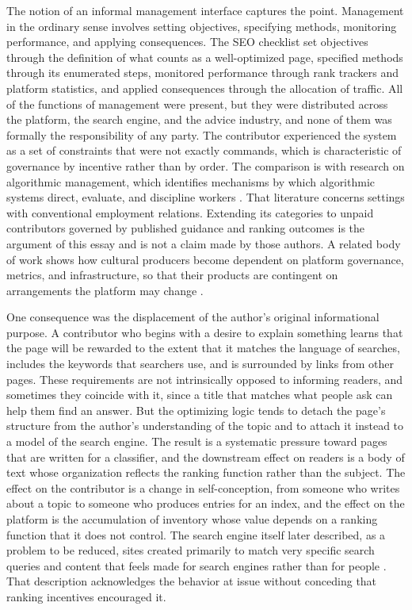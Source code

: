 \documentclass[11pt]{article}
\theoremstyle{remark}
\begin{document}
The notion of an informal management interface captures the point. Management in the ordinary sense involves setting objectives, specifying methods, monitoring performance, and applying consequences. The SEO checklist set objectives through the definition of what counts as a well-optimized page, specified methods through its enumerated steps, monitored performance through rank trackers and platform statistics, and applied consequences through the allocation of traffic. All of the functions of management were present, but they were distributed across the platform, the search engine, and the advice industry, and none of them was formally the responsibility of any party. The contributor experienced the system as a set of constraints that were not exactly commands, which is characteristic of governance by incentive rather than by order. The comparison is with research on algorithmic management, which identifies mechanisms by which algorithmic systems direct, evaluate, and discipline workers \cite{kellogg2020}. That literature concerns settings with conventional employment relations. Extending its categories to unpaid contributors governed by published guidance and ranking outcomes is the argument of this essay and is not a claim made by those authors. A related body of work shows how cultural producers become dependent on platform governance, metrics, and infrastructure, so that their products are contingent on arrangements the platform may change \cite{nieborg2018}.

One consequence was the displacement of the author's original informational purpose. A contributor who begins with a desire to explain something learns that the page will be rewarded to the extent that it matches the language of searches, includes the keywords that searchers use, and is surrounded by links from other pages. These requirements are not intrinsically opposed to informing readers, and sometimes they coincide with it, since a title that matches what people ask can help them find an answer. But the optimizing logic tends to detach the page's structure from the author's understanding of the topic and to attach it instead to a model of the search engine. The result is a systematic pressure toward pages that are written for a classifier, and the downstream effect on readers is a body of text whose organization reflects the ranking function rather than the subject. The effect on the contributor is a change in self-conception, from someone who writes about a topic to someone who produces entries for an index, and the effect on the platform is the accumulation of inventory whose value depends on a ranking function that it does not control. The search engine itself later described, as a problem to be reduced, sites created primarily to match very specific search queries and content that feels made for search engines rather than for people \cite{tucker2024}. That description acknowledges the behavior at issue without conceding that ranking incentives encouraged it.
\end{document}
